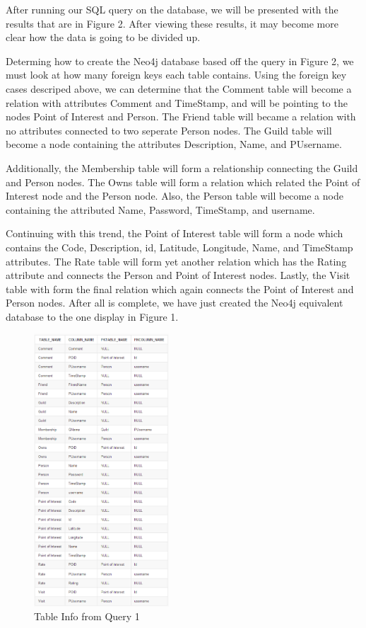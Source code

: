 \documentclass{acm_proc_article-sp}
\begin{document}
After running our SQL query on the database, we will be presented with the results that are in Figure 2. After viewing these results, it may become more clear how the data is going to be divided up.

Determing how to create the Neo4j database based off the query in Figure 2, we must look at how many foreign keys each table contains.  Using the foreign key cases descriped above, we can determine that the Comment table will become a relation with attributes Comment and TimeStamp, and will be pointing to the nodes Point of Interest and Person.  The Friend table will became a relation with no attributes connected to two seperate Person nodes.  The Guild table will become a node containing the attributes Description, Name, and PUsername. 

Additionally, the Membership table will form a relationship connecting the Guild and Person nodes.  The Owns table will form a relation which related the Point of Interest node and the Person node.  Also, the Person table will become a node containing the attributed Name, Password, TimeStamp, and username. 

Continuing with this trend, the Point of Interest table will form a node which contains the Code, Description, id, Latitude, Longitude, Name, and TimeStamp attributes.  The Rate table will form yet another relation which has the Rating attribute and connects the Person and Point of Interest nodes.  Lastly, the Visit table with form the final relation which again connects the Point of Interest and Person nodes.  After all is complete, we have just created the Neo4j equivalent database to the one display in Figure 1. 

\begin{figure}
  \caption{Table Info from Query 1}
  \centering
    \includegraphics[width=0.45\textwidth]{Images/TableInfo}
\end{figure}
\end{document}
